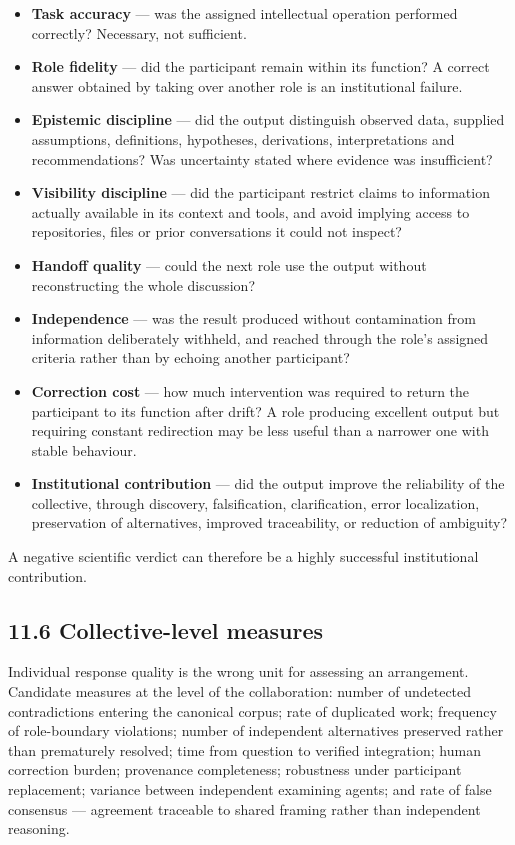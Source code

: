 \begin{itemize}
  \item \textbf{Task accuracy} — was the assigned intellectual operation performed correctly? Necessary, not sufficient.
  \item \textbf{Role fidelity} — did the participant remain within its function? A correct answer obtained by taking over another role is an institutional failure.
  \item \textbf{Epistemic discipline} — did the output distinguish observed data, supplied assumptions, definitions, hypotheses, derivations, interpretations and recommendations? Was uncertainty stated where evidence was insufficient?
  \item \textbf{Visibility discipline} — did the participant restrict claims to information actually available in its context and tools, and avoid implying access to repositories, files or prior conversations it could not inspect?
  \item \textbf{Handoff quality} — could the next role use the output without reconstructing the whole discussion?
  \item \textbf{Independence} — was the result produced without contamination from information deliberately withheld, and reached through the role's assigned criteria rather than by echoing another participant?
  \item \textbf{Correction cost} — how much intervention was required to return the participant to its function after drift? A role producing excellent output but requiring constant redirection may be less useful than a narrower one with stable behaviour.
  \item \textbf{Institutional contribution} — did the output improve the reliability of the collective, through discovery, falsification, clarification, error localization, preservation of alternatives, improved traceability, or reduction of ambiguity?
\end{itemize}
A negative scientific verdict can therefore be a highly successful institutional contribution.


\subsection*{11.6 Collective-level measures}
\label{sec:en:11.6}

Individual response quality is the wrong unit for assessing an arrangement. Candidate measures at the level of the collaboration: number of undetected contradictions entering the canonical corpus; rate of duplicated work; frequency of role-boundary violations; number of independent alternatives preserved rather than prematurely resolved; time from question to verified integration; human correction burden; provenance completeness; robustness under participant replacement; variance between independent examining agents; and rate of false consensus — agreement traceable to shared framing rather than independent reasoning.

